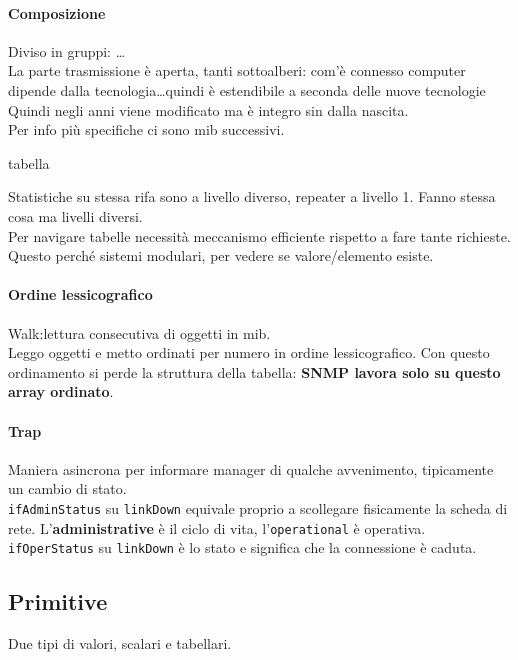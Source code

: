 \documentclass[10pt]{book}
\begin{document}
\paragraph{Composizione} Diviso in gruppi: \ldots\\
La parte trasmissione è aperta, tanti sottoalberi: com'è connesso computer dipende dalla tecnologia\ldots quindi è estendibile a seconda delle nuove tecnologie\\
Quindi negli anni viene modificato ma è integro sin dalla nascita.\\
Per info più specifiche ci sono mib successivi.
\begin{center}
	tabella
\end{center}
Statistiche su stessa rifa sono a livello diverso, repeater a livello 1. Fanno stessa cosa ma livelli diversi.\\
Per navigare tabelle necessità meccanismo efficiente rispetto a fare tante richieste. Questo perché sistemi modulari, per vedere se valore/elemento esiste.
\paragraph{Ordine lessicografico} Walk:lettura consecutiva di oggetti in mib.\\
Leggo oggetti e metto ordinati per numero in ordine lessicografico. Con questo ordinamento si perde la struttura della tabella: \textbf{SNMP lavora solo su questo array ordinato}.
\paragraph{Trap} Maniera asincrona per informare manager di qualche avvenimento, tipicamente un cambio di stato.\\
\texttt{ifAdminStatus} su \texttt{linkDown} equivale proprio a scollegare fisicamente la scheda di rete. L'\textbf{administrative} è il ciclo di vita, l'\texttt{operational} è operativa. \texttt{ifOperStatus} su \texttt{linkDown} è lo stato e significa che la connessione è caduta.
\subsection{Primitive}
Due tipi di valori, scalari e tabellari.
\end{document}
